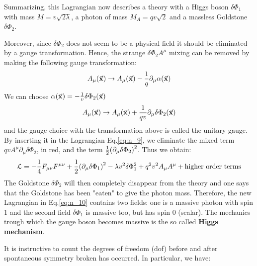 \documentclass[../../Main/Main.tex]{subfiles}
\begin{document}
Summarizing, this Lagrangian now describes a theory with a Higgs boson \( \delta \Phi _1 \) with mass \( M= v \sqrt{2 \lambda }  \), a photon of mass \( M_A = qv \sqrt{2}  \) and a massless Goldstone \( \delta \Phi _2 \).


Moreover, since \( \delta \Phi _2 \) does not seem to be a physical field it should be eliminated by a gauge transformation. Hence, the strange \( \delta \Phi _2 A^\mu  \) mixing can be removed by making the following gauge transformation:
\begin{equation*}
  A _ \mu (\va{x}) \rightarrow A _ \mu (\va{x}) - \frac{1}{q} \partial_ \mu \alpha (\va{x})
\end{equation*}
We can choose \( \alpha (\va{x}) = - \frac{1}{v} \delta \Phi _2 (\va{x}) \)
\begin{equation*}
  A _ \mu (\va{x}) \rightarrow A _ \mu (\va{x}) + \frac{1}{qv} \partial_ \mu \delta \Phi _2 (\va{x})
\end{equation*}
and the gauge choice with the transformation above is called the unitary gauge.
By inserting it in the Lagrangian Eq.\eqref{eq:n_9}, we eliminate the mixed term \( q v A ^ \mu  \partial_ \mu  \delta \Phi _2  \), in red, and the term \( \frac{1}{2} \qty(\partial _ \mu  \delta \Phi _2 )^2  \). Thus we obtain:
\begin{equation}
  \mathcal{L} = - \frac{1}{4} F _{\mu \nu } F ^ {\mu \nu } + \frac{1}{2} \qty(\partial _ \mu  \delta \Phi _1 )^2 - \lambda v^2 \delta \Phi _1^2
  + q^2 v^2 A_ \mu A ^ \mu  + \text{higher order terms}
  \label{eq:n_10}
\end{equation}
The Goldstone \( \delta \Phi _2 \)  will then completely disappear from the theory and one says that the Goldstone has been "eaten" to give the photon mass.
Therefore, the new Lagrangian in Eq.\eqref{eq:n_10} contains two fields: one is a massive photon with spin 1 and the second field \( \delta \Phi _1 \) is massive too, but has spin 0 (scalar).
The mechanics trough which the gauge boson becomes massive is the so called \textbf{Higgs mechanism}.

It is instructive to count the degrees of freedom (dof) before and after spontaneous symmetry broken has occurred. In particular, we have:
\end{document}
